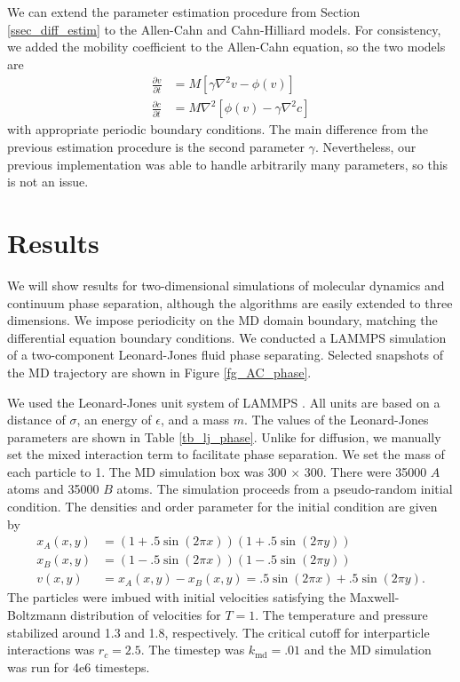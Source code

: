 \documentclass[12pt, reqno]{report}
\theoremstyle{definition}
\theoremstyle{remark}
\begin{document}
We can extend the parameter estimation procedure from Section {\ref{ssec_diff_estim}} to the Allen-Cahn and Cahn-Hilliard models.
For consistency, we added the mobility coefficient to the Allen-Cahn equation, so the two models are
\begin{align}
    \frac{\partial v}{\partial t}&=M[\gamma\nabla^2v-\phi(v)]\tag{AC}\\
    \frac{\partial c }{\partial t }&=M\nabla^2[\phi(v)-\gamma\nabla^2c]\tag{CH}
\end{align}
with appropriate periodic boundary conditions.
The main difference from the previous estimation procedure is the second parameter $\gamma$.
Nevertheless, our previous implementation was able to handle arbitrarily many parameters, so this is not an issue.


\section{Results}

We will show results for two-dimensional simulations of molecular dynamics and continuum phase separation, although the algorithms are easily extended to three dimensions.
We impose periodicity on the MD domain boundary, matching the differential equation boundary conditions.
We conducted a LAMMPS simulation of a two-component Leonard-Jones fluid phase separating.
Selected snapshots of the MD trajectory are shown in Figure \ref{fg_AC_phase}.

We used the Leonard-Jones unit system of LAMMPS \cite{LAMMPS}. 
All units are based on a distance of $\sigma$, an energy of $\epsilon$, and a mass $m$.
The values of the Leonard-Jones parameters are shown in Table \ref{tb_lj_phase}.
Unlike for diffusion, we manually set the mixed interaction term to facilitate phase separation.
We set the mass of each particle to 1.
The MD simulation box was 300 $\times$ 300.
There were 35000 $A$ atoms and 35000 $B$ atoms.
The simulation proceeds from a pseudo-random initial condition. 
The densities and order parameter for the initial condition are given by
\begin{equation} \label{eq_phase_IC}
\begin{split}
    x_A(x,y)&=(1+.5\sin(2\pi x))(1+.5\sin(2\pi y))\\
    x_B(x,y)&=(1-.5\sin(2\pi x))(1-.5\sin(2\pi y))\\
    v(x,y)&=x_A(x,y)-x_B(x,y)=.5\sin(2\pi x)+.5\sin(2\pi y) .
\end{split}
\end{equation}
The particles were imbued with initial velocities satisfying the Maxwell-Boltzmann distribution of velocities for $T=1$. 
The temperature and pressure stabilized around 1.3 and 1.8, respectively.
The critical cutoff for interparticle interactions was $r_c=2.5$.
The timestep was $k_\text{md}=.01$ and the MD simulation was run for 4e6 timesteps.
\end{document}
